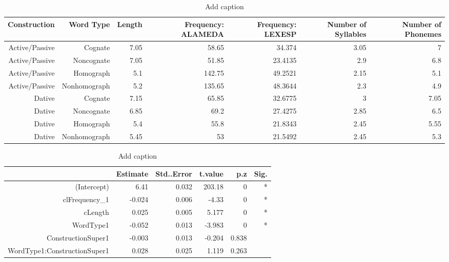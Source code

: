 \begin{table}[htbp]
  \centering
  \caption{Add caption}
    \begin{tabular}{rrrrrrr}
    \toprule
    Construction & Word Type & Length & Frequency: ALAMEDA & Frequency: LEXESP & Number of Syllables & Number of Phonemes \\
    \midrule
    Active/Passive & Cognate & 7.05  & 58.65 & 34.374 & 3.05  & 7 \\
    Active/Passive & Noncognate & 7.05  & 51.85 & 23.4135 & 2.9   & 6.8 \\
    Active/Passive & Homograph & 5.1   & 142.75 & 49.2521 & 2.15  & 5.1 \\
    Active/Passive & Nonhomograph & 5.2   & 135.65 & 48.3644 & 2.3   & 4.9 \\
    Dative & Cognate & 7.15  & 65.85 & 32.6775 & 3     & 7.05 \\
    Dative & Noncognate & 6.85  & 69.2  & 27.4275 & 2.85  & 6.5 \\
    Dative & Homograph & 5.4   & 55.8  & 21.8343 & 2.45  & 5.55 \\
    Dative & Nonhomograph & 5.45  & 53    & 21.5492 & 2.45  & 5.3 \\
    \bottomrule
    \end{tabular}%
  \label{tab:addlabel}%
\end{table}%
\begin{table}[htbp]
  \centering
  \caption{Add caption}
    \begin{tabular}{rrrrrr}
    \toprule
          & Estimate & Std..Error & t.value & p.z   & Sig. \\
    \midrule
    (Intercept) & 6.41  & 0.032 & 203.18 & 0     & * \\
    clFrequency\_1 & -0.024 & 0.006 & -4.33 & 0     & * \\
    cLength & 0.025 & 0.005 & 5.177 & 0     & * \\
    WordType1 & -0.052 & 0.013 & -3.983 & 0     & * \\
    ConstructionSuper1 & -0.003 & 0.013 & -0.204 & 0.838 &  \\
    WordType1:ConstructionSuper1 & 0.028 & 0.025 & 1.119 & 0.263 &  \\
    \bottomrule
    \end{tabular}%
  \label{tab:addlabel}%
\end{table}%
